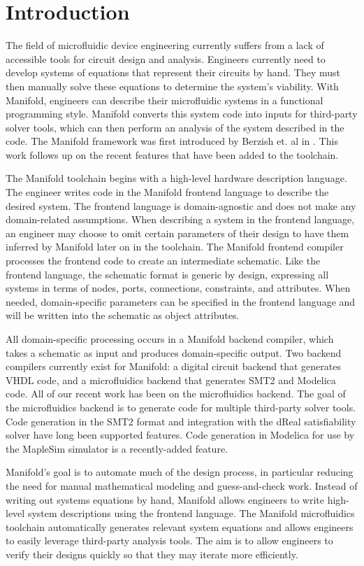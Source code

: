 \section{Introduction}

The field of microfluidic device engineering currently suffers from a lack of accessible tools for circuit design and analysis.
Engineers currently need to develop systems of equations that represent their circuits by hand.
They must then manually solve these equations to determine the system's viability.
With Manifold, engineers can describe their microfluidic systems in a functional programming style. 
Manifold converts this system code into inputs for third-party solver tools, which can then perform an analysis of the system described in the code.
The Manifold framework was first introduced by Berzish et. al in \cite{Berzish16cascon}.
This work follows up on the recent features that have been added to the toolchain.

The Manifold toolchain begins with a high-level hardware description language.
The engineer writes code in the Manifold frontend language to describe the desired system.
The frontend language is domain-agnostic and does not make any domain-related assumptions.
When describing a system in the frontend language, an engineer may choose to omit certain parameters of their design to have them inferred by Manifold later on in the toolchain.
The Manifold frontend compiler processes the frontend code to create an intermediate schematic.
Like the frontend language, the schematic format is generic by design, expressing all systems in terms of nodes, ports, connections, constraints, and attributes.
When needed, domain-specific parameters can be specified in the frontend language and will be written into the schematic as object attributes.

All domain-specific processing occurs in a Manifold backend compiler, which takes a schematic as input and produces domain-specific output.
Two backend compilers currently exist for Manifold: a digital circuit backend that generates VHDL code, and a microfluidics backend that generates SMT2 and Modelica code.
All of our recent work has been on the microfluidics backend.
The goal of the microfluidics backend is to generate code for multiple third-party solver tools.
Code generation in the SMT2 format and integration with the dReal satisfiability solver have long been supported features.
Code generation in Modelica for use by the MapleSim simulator is a recently-added feature.

Manifold's goal is to automate much of the design process, in particular reducing the need for manual mathematical modeling and guess-and-check work.
Instead of writing out systems equations by hand, Manifold allows engineers to write high-level system descriptions using the frontend language.
The Manifold microfluidics toolchain automatically generates relevant system equations and allows engineers to easily leverage third-party analysis tools.
The aim is to allow engineers to verify their designs quickly so that they may iterate more efficiently.
